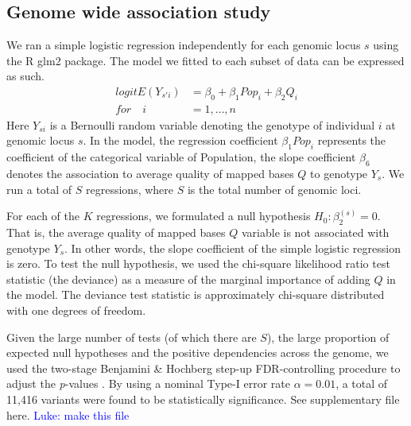 \documentclass[9pt,lineno]{elife}
\newcommand{\luke}[1]{\textcolor{blue}{Luke: #1}}
\begin{document}
\subsection{Genome wide association study}
We ran a simple logistic regression independently for each genomic locus $s$ using the R glm2 package\citep{RDevelopmentCoreTeam2016}. The model we fitted to each subset of data can be expressed as such.
\begin{align*}
{logit}{E(Y_{s'i})} &= \beta_{0}  + \beta_{1}{Pop}_{i}  + \beta_{2}Q_{i}
\\
\textit{for}\quad i &= 1,\hdots, n
\end{align*}
Here $Y_{si}$ is a Bernoulli random variable denoting the genotype of individual $i$ at genomic locus $s$. 
In the model, the regression coefficient $\beta_{1}{Pop}_{i}$ represents the coefficient of the categorical variable of Population, the slope coefficient $\beta_{6}$ denotes the association to average quality of mapped bases $Q$ to genotype $Y_{s}$. 
We run a total of $S$ regressions, where $S$ is the total number of genomic loci. 

For each of the $K$ regressions, we formulated a null hypothesis $H_{0}: \beta_{2}^{(s)}=0$. That is, the average quality of mapped bases $Q$ variable is not associated with genotype $Y_{s}$.
In other words, the slope coefficient of the simple logistic regression is zero.
To test the null hypothesis, we used the chi-square likelihood ratio test statistic (the deviance) as a measure of the marginal importance of adding $Q$ in the model. 
The deviance test statistic is approximately chi-square distributed with one degrees of freedom.

Given the large number of tests (of which there are $S$), the large proportion of expected null hypotheses and the positive dependencies across the genome, we used the two-stage Benjamini \& Hochberg step-up FDR-controlling procedure to adjust the \textit{p}-values \citep{Benjamini2006}.
By using a nominal Type-I error rate $\alpha = 0.01$, a total of 11,416 variants were found to be statistically significance. See supplementary file {here}. \luke{make this file}
\end{document}
